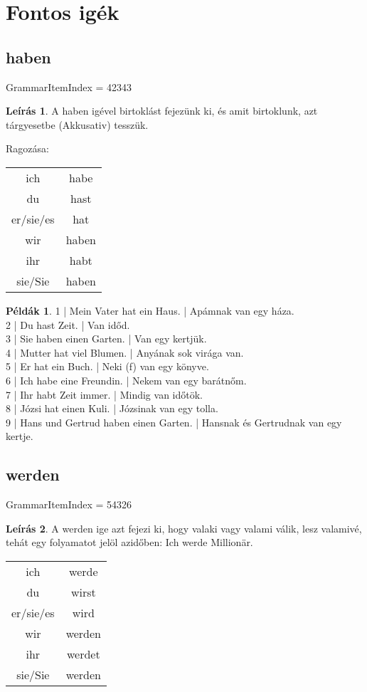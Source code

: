 \documentclass{article}
\theoremstyle{definition}
\newtheorem*{exmp}{Példák}
\newtheorem*{desc}{Leírás}
\begin{document}
\section{Fontos igék}

\subsection{haben}

GrammarItemIndex = 42343

\begin{desc}
A haben igével birtoklást fejezünk ki, és amit birtoklunk, azt tárgyesetbe (Akkusativ) tesszük.

Ragozása:

\begin{tabular}{cc}
ich & habe\\
du & hast\\
er/sie/es & hat\\
wir & haben\\
ihr & habt\\
sie/Sie & haben\\
\end{tabular}
\end{desc}

\begin{exmp}
1 | Mein Vater hat ein Haus. | Apámnak van egy háza.\\
2 | Du hast Zeit. | Van időd.\\
3 | Sie haben einen Garten. | Van egy kertjük.\\
4 | Mutter hat viel Blumen. | Anyának sok virága van.\\
5 | Er hat ein Buch. | Neki (f) van egy könyve.\\
6 | Ich habe eine Freundin. | Nekem van egy barátnőm.\\
7 | Ihr habt Zeit immer. | Mindig van időtök.\\
8 | Józsi hat einen Kuli. | Józsinak van egy tolla.\\
9 | Hans und Gertrud haben einen Garten. | Hansnak és Gertrudnak van egy kertje.\\
\end{exmp}

\subsection{werden}

GrammarItemIndex = 54326

\begin{desc}
A werden ige azt fejezi ki, hogy valaki vagy valami válik, lesz
valamivé, tehát egy folyamatot jelöl azidőben:
Ich werde Millionär.

\begin{tabular}{cc}
 ich & werde \\
 du & wirst \\
 er/sie/es & wird \\
 wir & werden \\
 ihr & werdet \\
 sie/Sie & werden \\
\end{tabular}
\end{desc}
\end{document}
